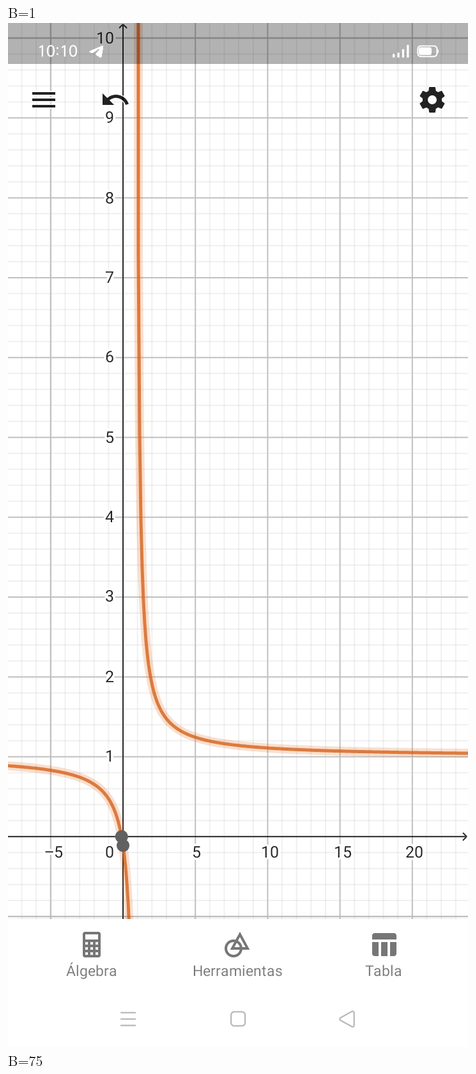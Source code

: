 \documentclass{article}
\begin{document}
\begin{center}
  B=1\\
  \includegraphics[scale=0.2]{Imagenes/b_1.jpg}\\
  B=75\\

\end{center}
\end{document}
